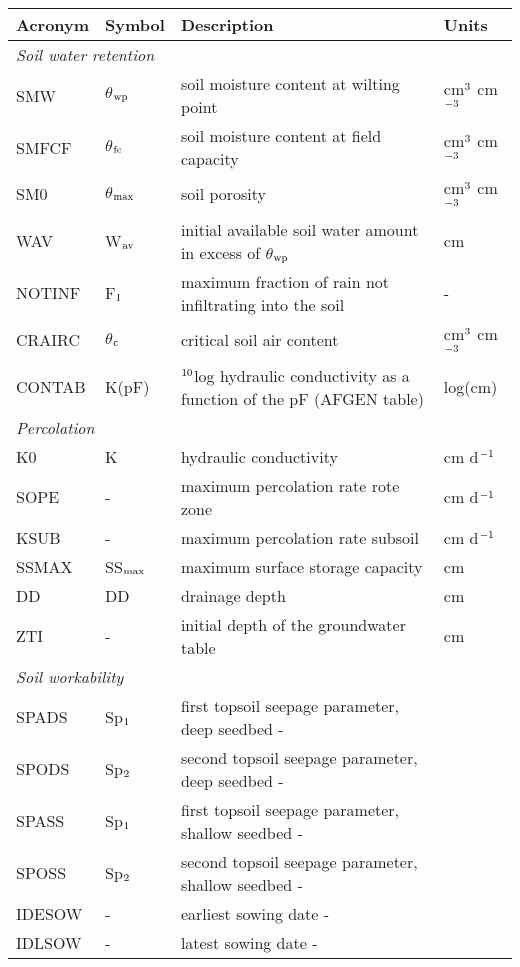 \small
\begin{longtable}[c]{llll}
\hline \hline
\textbf{Acronym} & \textbf{Symbol} & \textbf{Description} & \textbf{Units}\\
\hline

\multicolumn{4}{l}{\textit{Soil water retention}}\\   
SMW & $\theta$$_{{\rm wp}}$ & soil moisture content at wilting point    &
   cm$^{{\rm 3}}$ cm$^{{\rm -3}}$\\
SMFCF & $\theta$$_{{\rm fc}}$ & soil moisture content at field capacity   &
   cm$^{{\rm 3}}$ cm$^{{\rm -3}}$\\
SM0 & $\theta$$_{{\rm max}}$ & soil porosity   &    cm$^{{\rm 3}}$ cm$^{{\rm -3}}$\\
WAV & W$_{{\rm av}}$ & initial available soil water amount in excess of 
   $\theta$$_{{\rm wp}}$   &    cm\\
NOTINF & F$_{{\rm I}}$ & maximum fraction of rain not infiltrating into the 
   soil   &    -\\
CRAIRC & $\theta$$_{{\rm c}}$ & critical soil air content    &
   cm$^{{\rm 3}}$ cm$^{{\rm -3}}$\\
CONTAB & K(pF) & $^{{\rm 10}}$log hydraulic conductivity as a function of the pF 
(AFGEN table)   &    log(cm)\\

\multicolumn{4}{l}{\textit{Percolation}}\\   
K0 & K & hydraulic conductivity   &    cm d$^{{\rm -1}}$\\
SOPE & - & maximum percolation rate rote zone   &    cm d$^{{\rm -1}}$\\
KSUB & - & maximum percolation rate subsoil   &    cm d$^{{\rm -1}}$\\
SSMAX & SS$_{{\rm max}}$ & maximum surface storage capacity   &    cm\\
DD & DD & drainage depth   &    cm\\
ZTI & - & initial depth of the groundwater table   &    cm\\

\multicolumn{4}{l}{\textit{Soil workability}}\\   
SPADS & Sp$_{{\rm 1}}$ & first topsoil seepage parameter, deep seedbed       -\\
SPODS & Sp$_{{\rm 2}}$ & second topsoil seepage parameter, deep seedbed       -\\
SPASS & Sp$_{{\rm 1}}$ & first topsoil seepage parameter, shallow seedbed       -\\
SPOSS & Sp$_{{\rm 2}}$ & second topsoil seepage parameter, shallow seedbed       -\\
IDESOW & - & earliest sowing date       -\\
IDLSOW & - & latest sowing date       -\\

\hline \hline

\end{longtable}
\normalfont
